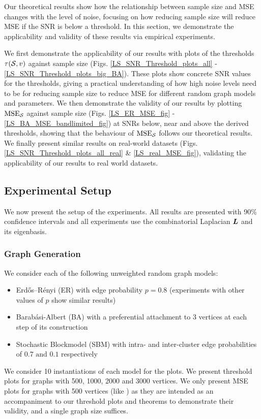 Our theoretical results show how the relationship between sample size and MSE changes with the level of noise, focusing on how reducing sample size will reduce MSE if the SNR is below a threshold. In this section, we demonstrate  the applicability and validity of these results via empirical experiments. 

We first demonstrate the applicability of our results with plots of the thresholds $\tau(\mathcal{S},v)$ against sample size (Figs. \ref{LS_SNR_Threshold_plots_all} - \ref{LS_SNR_Threshold_plots_big_BA}). These plots show concrete SNR values for the thresholds, giving a practical understanding of how high noise levels need to be for reducing sample size to reduce MSE for different random graph models and parameters.  We then demonstrate the validity of our results by plotting $\textrm{MSE}_{\mathcal{S}}$ against sample size (Figs. \ref{LS_ER_MSE_fig} - \ref{LS_BA_MSE_bandlimited_fig}) at SNRs below, near and above the derived thresholds, showing that the behaviour of $\textrm{MSE}_{\mathcal{S}}$ follows our theoretical results. We finally present similar results on real-world datasets (Figs. \ref{LS_SNR_Threshold_plots_all_real} \& \ref{LS_real_MSE_fig}), validating the applicability of our results to real world datasets.


\subsection{Experimental Setup}
We now present the setup of the experiments. All results are presented with 90\% confidence intervals and all experiments use the combinatorial Laplacian $\bm{L}$ and its eigenbasis.
\subsubsection{ Graph Generation}
We consider each of the following unweighted random graph models:
\begin{itemize}
    \item Erdős–Rényi (ER) with edge probability $p=0.8$ (experiments with other values of $p$ show similar results)
    \item Barabási-Albert (BA) with a preferential attachment to 3 vertices at each step of its construction
    \item Stochastic Blockmodel (SBM) with intra- and inter-cluster edge probabilities of $0.7 \text{ and }0.1$ respectively
\end{itemize}
We consider 10 instantiations of each model for the plots. We present threshold plots for graphs with 500, 1000, 2000 and 3000 vertices. We only present MSE plots for graphs with 500 vertices  (like \cite[Fig 8]{bai2020fast}) as they are intended as an accompaniment to our threshold plots and theorems to demonstrate their validity, and a single graph size suffices. 

